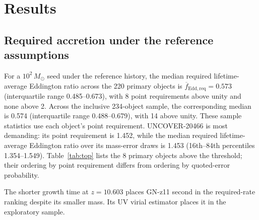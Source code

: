 \documentclass[11pt]{article}
\begin{document}
\section{Results}

\subsection{Required accretion under the reference assumptions}

For a $10^2\,M_\odot$ seed under the reference history, the median required
lifetime-average Eddington ratio across the 220 primary objects is
$\overline{f}_{\mathrm{Edd,req}}=0.573$ (interquartile range 0.485--0.673),
with 8 point requirements above unity and none above 2. Across the
inclusive 234-object sample, the corresponding median is 0.574
(interquartile range 0.488--0.679), with 14 above unity. These sample
statistics use each object's point requirement.
UNCOVER-20466 is most demanding: its point requirement is 1.452, while the
median required lifetime-average Eddington ratio over its mass-error draws
is 1.453 (16th--84th percentiles 1.354--1.549).
Table~\ref{tab:top} lists the 8 primary objects above the threshold; their ordering by
point requirement differs from ordering by quoted-error probability.

The shorter growth time at $z=10.603$ places GN-z11 second in the required-rate
ranking despite its smaller mass. Its UV virial estimator places it in
the exploratory sample.
\end{document}
